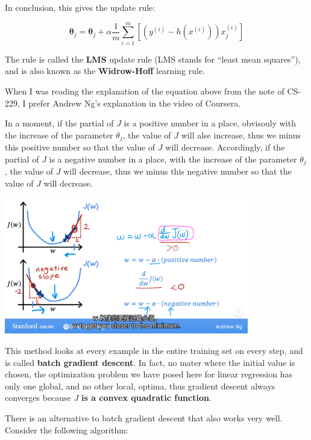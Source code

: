 \documentclass[fontset=windows,pass]{article}
\numberwithin{equation}{subsection} %
\begin{document}
In conclusion, this gives the update rule:

\begin{equation}
	\boldsymbol{\theta}_j = \boldsymbol{\theta}_j + \alpha \frac{1}{m} \sum_{i=1}^{m} \left[\left(y^{(i)} - h(x^{(i)})\right) x^{(i)}_{j}\right]
\end{equation}

The rule is called the \textbf{LMS} update rule (LMS stands for “least mean squares”),
and is also known as the \textbf{Widrow-Hoff} learning rule.

When I was reading the explanation of the equation above from the note of CS-229, I prefer Andrew Ng's
explanation in the video of Coursera.

In a moment, if the partial of $J$ is a positive number in a place, obvisouly with the increase of the parameter
$\theta_j$, the value of $J$ will alse increase, thus we minus this positive number so that the value of $J$ will decrease.
Accordingly, if the partial of $J$ is a negative number in a place, with the increase of the parameter
$\theta_j$, the value of $J$ will decrease, thus we minus this negative number so that the value of $J$ will decrease.

\begin{center}
	\includegraphics[width = 0.8\textwidth]{Figures/Gradient_Explanation.png}
\end{center}

This method looks at every example in the entire training set on every step, and is called \textbf{batch gradient descent}.
In fact, no mater where the initial value is chosen,  the optimization problem we have posed here
for linear regression has only one global, and no other local, optima, thus gradient descent always converges
because $J$ \textbf{is a convex quadratic function}.

There is an alternative to batch gradient descent that also works very well. Consider the following algorithm:
\end{document}
